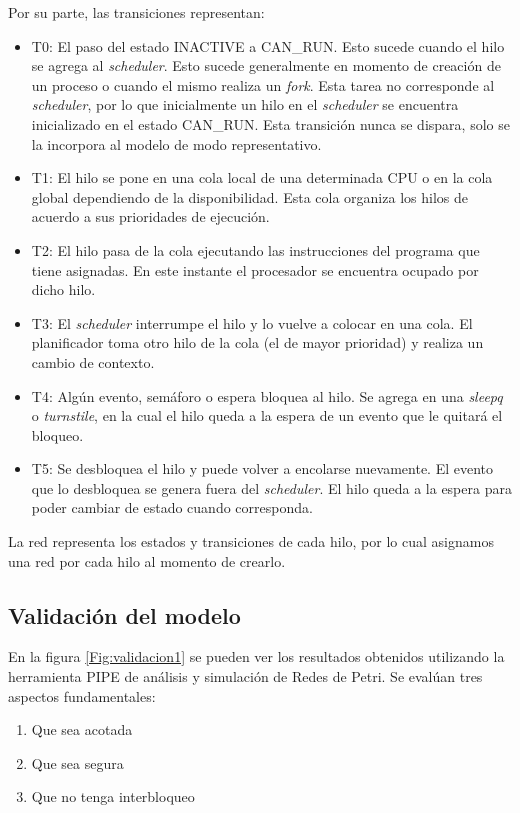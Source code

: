 \documentclass[a4paper]{book}
\begin{document}
Por su parte, las transiciones representan:
\begin{itemize}
\item T0: El paso del estado INACTIVE a CAN\_RUN. Esto sucede cuando el hilo se agrega al \emph{scheduler}. Esto sucede generalmente en momento de creaci\'on de un proceso o cuando el mismo realiza un \emph{fork}. Esta tarea no corresponde al \emph{scheduler}, por lo que inicialmente un hilo en el \emph{scheduler} se encuentra inicializado en el estado CAN\_RUN. Esta transici\'on nunca se dispara, solo se la incorpora al modelo de modo representativo.
\item T1: El hilo se pone en una cola local de una determinada CPU o en la cola global dependiendo de la disponibilidad. Esta cola organiza los hilos de acuerdo a sus prioridades de ejecuci\'on.
\item T2: El hilo pasa de la cola ejecutando las instrucciones del programa que tiene asignadas. En este instante el procesador se encuentra ocupado por dicho hilo.
\item T3: El \emph{scheduler} interrumpe el hilo y lo vuelve a colocar en una cola. El planificador toma otro hilo de la cola (el de mayor prioridad) y realiza un cambio de contexto.
\item T4: Alg\'un evento, sem\'aforo o espera bloquea al hilo. Se agrega en una \emph{sleepq} o \emph{turnstile}, en la cual el hilo queda a la espera de un evento que le quitar\'a el bloqueo.
\item T5: Se desbloquea el hilo y puede volver a encolarse nuevamente. El evento que lo desbloquea se genera fuera del \emph{scheduler}. El hilo queda a la espera para poder cambiar de estado cuando corresponda.
\end{itemize}
La red representa los estados y transiciones de cada hilo, por lo cual asignamos una red por cada hilo al momento de crearlo.

\subsection{Validaci\'on del modelo}
En la figura \ref{Fig:validacion1} se pueden ver los resultados obtenidos utilizando la herramienta PIPE de an\'alisis y simulaci\'on de Redes de Petri. Se eval\'uan tres aspectos fundamentales:
\begin{enumerate}
\item Que sea acotada
\item Que sea segura
\item Que no tenga interbloqueo
\end{enumerate}
\end{document}
